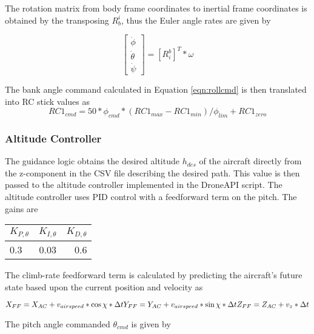 \documentclass{aiaa}
\begin{document}
The rotation matrix from body frame coordinates to inertial frame coordinates is obtained by the transposing $R_b^i$, thus the Euler angle rates are given by

\begin{equation}
	\begin{bmatrix}
    \dot{\phi}\\
    \dot{\theta}\\
    \dot{\psi}
    \end{bmatrix}
    =[R_i^b]^T*\omega
\end{equation}

The bank angle command calculated in Equation \eqref{eqn:rollcmd} is then translated into RC stick values as
\begin{equation}
RC1_{cmd} = 50*\phi_{cmd}*(RC1_{max} - RC1_{min})/\phi_{lim} + RC1_{zero}
\end{equation}

\subsubsection{Altitude Controller}

The guidance logic obtains the desired altitude $h_{des}$ of the aircraft directly from the z-component in the CSV file describing the desired path. This value is then passed to the altitude controller implemented in the DroneAPI script. The altitude controller uses PID control with a feedforward term on the pitch. The gains are
\begin{center}
\begin{tabular}{ l| c | r}
	
    $K_{P,\theta}$ & $K_{I,\theta}$ & $K_{D,\theta}$ \\
    \hline \hline
    0.3 & 0.03 & 0.6 \\
    \hline


\end{tabular}
\end{center}
The climb-rate feedforward term is calculated by predicting the aircraft's future state based upon the current position and velocity as

\begin{equation}
X_{FF} = X_{AC} + v_{airspeed}*\cos{\chi}*\Delta t
\newline
Y_{FF} = Y_{AC} + v_{airspeed}*\sin{\chi}*\Delta t
\newline
Z_{FF} = Z_{AC} + v_z*\Delta t
\end{equation}

The pitch angle commanded $\theta_{cmd}$ is given by
\end{document}
